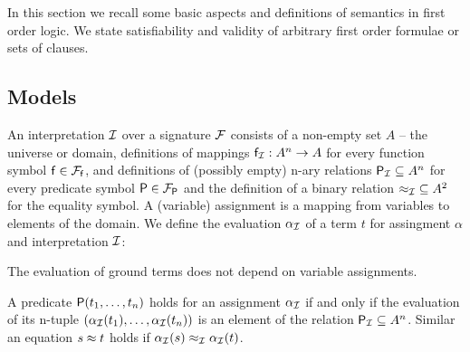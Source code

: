 In this section we recall some basic aspects and definitions of semantics in first order logic.
We state satisfiability and validity of arbitrary first order formulae or sets of clauses.

\subsection{Models}

\begin{definition}\label{def:interpretation}
	An {\myem interpretation} $\mathcal{I}$ over a signature $\mathcal{F}$ consists of a
	non-empty set $A$ -- the {\myem universe} or {\myem domain},
	definitions of mappings $\mathsf{f}_{\mathcal{I}}: A^n\rightarrow A$ for every function symbol $\mathsf{f}\in{\mathcal{F}_{\mathsf{f}}}$,
	and definitions of (possibly empty) n-ary relations
	 ${\mathsf{P}_{\mathcal{I}}}\subseteq A^n$ for every predicate symbol $\mathsf{P}\in{\mathcal{F}_{\mathsf{P}}}$
	 and the definition of a binary relation ${\approx_{\mathcal{I}}}\subseteq A^2$ for the equality symbol.
	 A (variable) {\myem assignment} is a mapping from variables to elements of the domain.
	 We define the {\myem evaluation} $\alpha_{\mathcal{I}}$ of a term $t$
	 for assingment $\alpha$ and interpretation $\mathcal{I}$:
\begin{remark}
	The evaluation of ground terms does not depend on variable assignments.
\end{remark}
\end{definition}

\begin{definition}\label{def:semantics:atoms}
	A predicate $\mathsf{P}(t_1,\ldots,t_n)$
	{\myem holds} for an assignment $\alpha_{\mathcal{I}}$
	if and only if the evaluation of its n-tuple $
	(\alpha_{\mathcal{I}}({t_1}),\ldots,\alpha_{\mathcal{I}}({t_n}))$
	is an element of the relation $\mathsf{P}_{\mathcal{I}}\subseteq A^n$.
	Similar an equation $s\approx t$
	holds if $\alpha_{\mathcal{I}}(s) \approx_{\mathcal{I}} \alpha_{\mathcal{I}}(t)$.
\end{definition}

